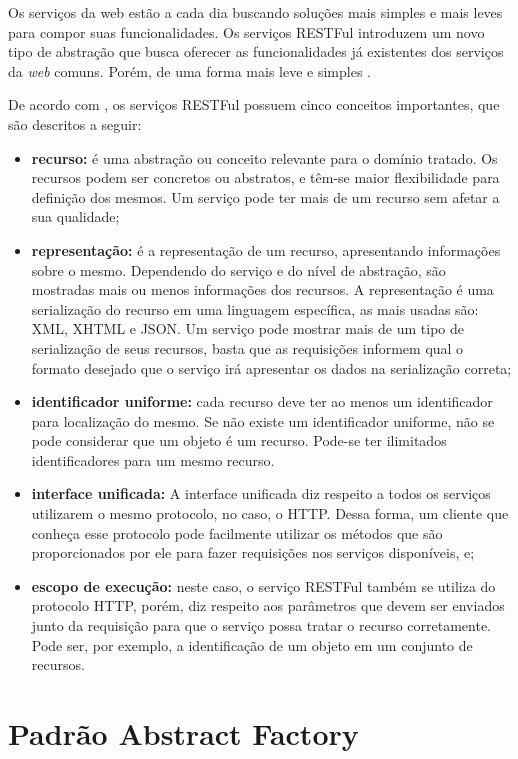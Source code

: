 \begin{apendicesenv}
Os serviços da web estão a cada dia buscando soluções mais simples e mais leves para compor suas funcionalidades. Os serviços RESTFul introduzem um novo tipo de abstração que busca oferecer as funcionalidades já existentes dos serviços da \textit{web} comuns. Porém, de uma forma mais leve e simples \cite{Pautasso:2009}.

De acordo com \cite{Filho:2009}, os serviços RESTFul possuem cinco conceitos importantes, que são descritos a seguir:

\begin{itemize}
	\item \textbf{recurso:} é uma abstração ou conceito relevante para o domínio tratado. Os recursos podem ser concretos ou abstratos, e têm-se maior flexibilidade para definição dos mesmos. Um serviço pode ter mais de um recurso sem afetar a sua qualidade;
	\item \textbf{representação:} é a representação de um recurso, apresentando informações sobre o mesmo. Dependendo do serviço e do nível de abstração, são mostradas mais ou menos informações dos recursos. A representação é uma serialização do recurso em uma linguagem específica, as mais usadas são: XML, XHTML e JSON. Um serviço pode mostrar mais de um tipo de serialização de seus recursos, basta que as requisições informem qual o formato desejado que o serviço irá apresentar os dados na serialização correta;
	\item \textbf{identificador uniforme:} cada recurso deve ter ao menos um identificador para localização do mesmo. Se não existe um identificador uniforme, não se pode considerar que um objeto é um recurso. Pode-se ter ilimitados identificadores para um mesmo recurso.
	\item \textbf{interface unificada:} A interface unificada diz respeito a todos os serviços utilizarem o mesmo protocolo, no caso, o HTTP. Dessa forma, um cliente que conheça esse protocolo pode facilmente utilizar os métodos que são proporcionados por ele para fazer requisições nos serviços disponíveis, e;
	\item \textbf{escopo de execução:} neste caso, o serviço RESTFul também se utiliza do protocolo HTTP, porém, diz respeito aos parâmetros que devem ser enviados junto da requisição para que o serviço possa tratar o recurso corretamente. Pode ser, por exemplo, a identificação de um objeto em um conjunto de recursos.
\end{itemize}

\section{Padrão Abstract Factory}
\label{sec:padrao_abstract_factory}


\end{apendicesenv}
